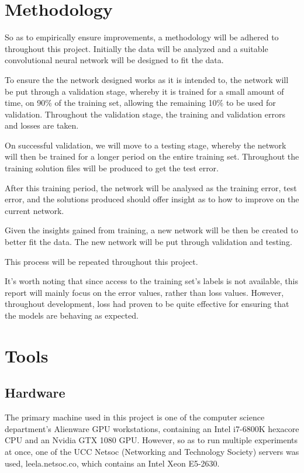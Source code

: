 \documentclass[12pt,a4paper,oneside,oldfontcommands]{memoir}
\begin{document}
\section{Methodology}

So as to empirically ensure improvements, a methodology will be adhered to throughout this project. Initially the data will be analyzed and a suitable convolutional neural network will be designed to fit the data. 

To ensure the the network designed works as it is intended to, the network will be put through a validation stage, whereby it is trained for a small amount of time, on 90\% of the training set, allowing the remaining 10\% to be used for validation. Throughout the validation stage, the training and validation errors and losses are taken. 

On successful validation, we will move to a testing stage, whereby the network will then be trained for a longer period on the entire training set. Throughout the training solution files will be produced to get the test error.

After this training period, the network will be analysed as the training error, test error, and the solutions produced should offer insight as to how to improve on the current network.

Given the insights gained from training, a new network will be then be created to better fit the data. The new network will be put through validation and testing. 

This process will be repeated throughout this project. 

It's worth noting that since access to the training set's labels is not available, this report will mainly focus on the error values, rather than loss values. However, throughout development, loss had proven to be quite effective for ensuring that the models are behaving as expected.
\section{Tools}

\subsection{Hardware}
The primary machine used in this project is one of the computer science department's Alienware GPU workstations, containing an Intel i7-6800K hexacore CPU and an Nvidia GTX 1080 GPU. However, so as to run multiple experiments at once, one of the UCC Netsoc (Networking and Technology Society) servers was used, leela.netsoc.co, which contains an Intel Xeon E5-2630.
\end{document}
